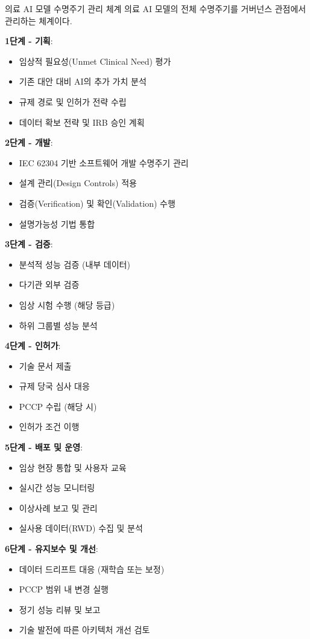 \begin{practicaltool}{의료 AI 모델 수명주기 관리 체계}
의료 AI 모델의 전체 수명주기를 거버넌스 관점에서 관리하는 체계이다.

\textbf{1단계 - 기획}:
\begin{itemize}
 \item 임상적 필요성(Unmet Clinical Need) 평가
 \item 기존 대안 대비 AI의 추가 가치 분석
 \item 규제 경로 및 인허가 전략 수립
 \item 데이터 확보 전략 및 IRB 승인 계획
\end{itemize}

\textbf{2단계 - 개발}:
\begin{itemize}
 \item IEC 62304 기반 소프트웨어 개발 수명주기 관리
 \item 설계 관리(Design Controls) 적용
 \item 검증(Verification) 및 확인(Validation) 수행
 \item 설명가능성 기법 통합
\end{itemize}

\textbf{3단계 - 검증}:
\begin{itemize}
 \item 분석적 성능 검증 (내부 데이터)
 \item 다기관 외부 검증
 \item 임상 시험 수행 (해당 등급)
 \item 하위 그룹별 성능 분석
\end{itemize}

\textbf{4단계 - 인허가}:
\begin{itemize}
 \item 기술 문서 제출
 \item 규제 당국 심사 대응
 \item PCCP 수립 (해당 시)
 \item 인허가 조건 이행
\end{itemize}

\textbf{5단계 - 배포 및 운영}:
\begin{itemize}
 \item 임상 현장 통합 및 사용자 교육
 \item 실시간 성능 모니터링
 \item 이상사례 보고 및 관리
 \item 실사용 데이터(RWD) 수집 및 분석
\end{itemize}

\textbf{6단계 - 유지보수 및 개선}:
\begin{itemize}
 \item 데이터 드리프트 대응 (재학습 또는 보정)
 \item PCCP 범위 내 변경 실행
 \item 정기 성능 리뷰 및 보고
 \item 기술 발전에 따른 아키텍처 개선 검토
\end{itemize}


\end{practicaltool}
